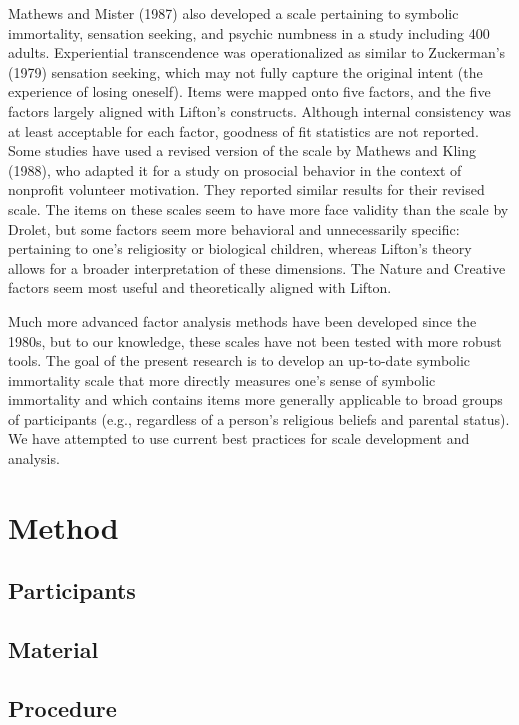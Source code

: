 \documentclass[
  man]{apa6}
\begin{document}
Mathews and Mister (1987) also developed a scale pertaining to
symbolic immortality, sensation seeking, and psychic numbness in a study
including 400 adults. Experiential transcendence was operationalized as
similar to Zuckerman's (1979) sensation seeking, which may
not fully capture the original intent (the experience of losing
oneself). Items were mapped onto five factors, and the five factors
largely aligned with Lifton's constructs. Although internal consistency
was at least acceptable for each factor, goodness of fit statistics are
not reported. Some studies have used a revised version of the scale by
Mathews and Kling (1988), who adapted it for a study on
prosocial behavior in the context of nonprofit volunteer motivation.
They reported similar results for their revised scale. The items on
these scales seem to have more face validity than the scale by Drolet,
but some factors seem more behavioral and unnecessarily specific:
pertaining to one's religiosity or biological children, whereas Lifton's
theory allows for a broader interpretation of these dimensions. The
Nature and Creative factors seem most useful and theoretically aligned
with Lifton.

Much more advanced factor analysis methods have been developed since the
1980s, but to our knowledge, these scales have not been tested with more
robust tools. The goal of the present research is to develop an
up-to-date symbolic immortality scale that more directly measures one's
sense of symbolic immortality and which contains items more generally
applicable to broad groups of participants (e.g., regardless of a
person's religious beliefs and parental status). We have attempted to
use current best practices for scale development and analysis.

\section{Method}\label{method}

\subsection{Participants}\label{participants}

\subsection{Material}\label{material}

\subsection{Procedure}\label{procedure}
\end{document}
